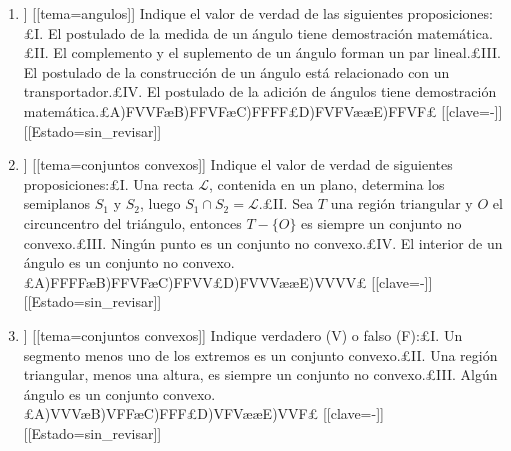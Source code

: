 \begin{enumerate}
\item[\textbf{8.}] [[curso=Geometria]] [[tema=angulos]] Indique el valor de verdad de las siguientes proposiciones:£I. El postulado de la medida de un ángulo tiene demostración matemática.£II. El complemento y el suplemento de un ángulo forman un par lineal.£III. El postulado de la construcción de un ángulo está relacionado con un transportador.£IV. El postulado de la adición de ángulos tiene demostración matemática.£A)FVVFæB)FFVFæC)FFFF£D)FVFVææE)FFVF£ [[clave=-]] [[Estado=sin_revisar]]
\item[\textbf{16.}] [[curso=Geometria]] [[tema=conjuntos convexos]] Indique el valor de verdad de siguientes proposiciones:£I. Una recta $\mathcal{L}$, contenida en un plano, determina los semiplanos $S_1$ y $S_2$, luego $S_1\cap S_2=\mathcal{L}$.£II. Sea $T$ una región triangular y $O$ el circuncentro del triángulo, entonces $T-\{O\}$ es siempre un conjunto no convexo.£III. Ningún punto es un conjunto no convexo.£IV. El interior de un ángulo es un conjunto no convexo.£A)FFFFæB)FFVFæC)FFVV£D)FVVVææE)VVVV£ [[clave=-]] [[Estado=sin_revisar]]
\item[\textbf{17.}] [[curso=Geometria]] [[tema=conjuntos convexos]] Indique verdadero (V) o falso (F):£I. Un segmento menos uno de los extremos es un conjunto convexo.£II. Una región triangular, menos una altura, es siempre un conjunto no convexo.£III. Algún ángulo es un conjunto convexo.£A)VVVæB)VFFæC)FFF£D)VFVææE)VVF£ [[clave=-]] [[Estado=sin_revisar]]
\end{enumerate}
